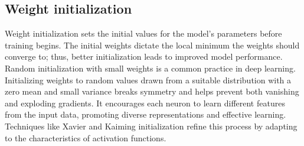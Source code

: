 \subsection{Weight initialization}
Weight initialization sets the initial values for the model's parameters before training begins. The initial weights dictate the local minimum the weights should converge to; thus, better initialization leads to improved model performance. %
Random initialization with small weights is a common practice in deep learning. Initializing weights to random values drawn from a suitable distribution with a zero mean and small variance breaks symmetry and helps prevent both vanishing and exploding gradients. It encourages each neuron to learn different features from the input data, promoting diverse representations and effective learning. Techniques like Xavier \cite{glorot} and Kaiming \cite{he2015} initialization refine this process by adapting to the characteristics of activation functions.
